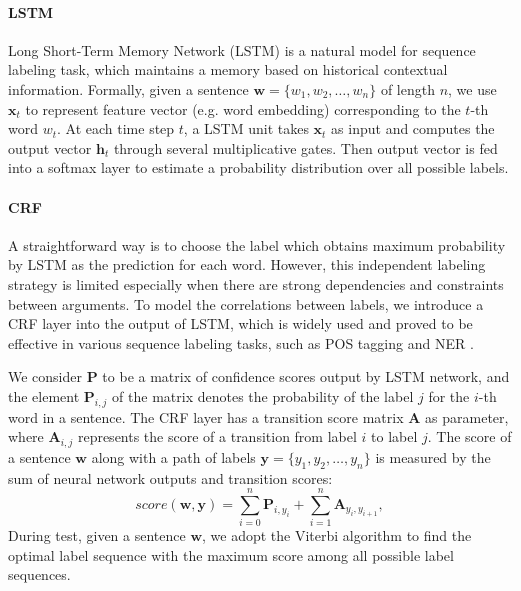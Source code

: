 \paragraph{LSTM}
Long Short-Term Memory Network (LSTM) \cite{hochreiter1997long} is a natural model for sequence labeling task, which maintains a memory based on historical contextual information. Formally, given a sentence $\bm{w} = \{w_1, w_2, \dots, w_n\}$ of length $n$, we use $\textbf{x}_t$ to represent feature vector (e.g. word embedding) corresponding to the $t$-th word $w_t$. At each time step $t$, a LSTM unit takes $\textbf{x}_t$ as input and computes the output vector $\textbf{h}_t$ through several multiplicative gates. Then output vector is fed into a softmax layer to estimate a probability distribution over all possible labels.

\paragraph{CRF}
A straightforward way is to choose the label which obtains maximum probability by LSTM as the prediction for each word. However, this independent labeling strategy is limited especially when there are strong dependencies and constraints between arguments.
To model the correlations between labels, we introduce a CRF layer into the output of LSTM, which is widely used and proved to be effective in various sequence labeling tasks, such as POS tagging and NER \cite{collobert2011natural,huang2015bidirectional,lample2016neural}.

We consider $\textbf{P}$ to be a matrix of confidence scores output by LSTM network, and the element $\textbf{P}_{i,j}$ of the matrix denotes the probability of the label $j$ for the $i$-th word in a sentence. The CRF layer has a transition score matrix $\textbf{A}$ as parameter, where $\textbf{A}_{i,j}$ represents the score of a transition from label $i$ to label $j$. The score of a sentence $\bm{w}$ along with a path of labels $\bm{y} = \{y_1, y_2, \ldots, y_n\}$ is measured by the sum of neural network outputs and transition scores: 
\begin{equation}
	score(\bm{w}, \bm{y}) = \sum\limits_{i=0}^n\textbf{P}_{i, y_i} + \sum\limits_{i=1}^n\textbf{A}_{y_i, y_{i+1}},
\end{equation}
During test, given a sentence $\bm{w}$, we adopt the Viterbi algorithm \cite{rabiner1989tutorial} to find the optimal label sequence with the maximum score among all possible label sequences.

